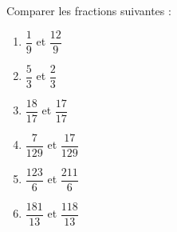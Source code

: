\begin{exercice*}
   Comparer les fractions suivantes : \medskip
   \begin{multicols}{2}
      \begin{enumerate}
         \item $\dfrac{1}{9}$ et $\dfrac{12}{9}$ \bigskip
         \item $\dfrac{5}{3}$ et $\dfrac{2}{3}$ \bigskip
         \item $\dfrac{18}{17}$ et $\dfrac{17}{17}$ \bigskip
         \item $\dfrac{7}{129}$ et $\dfrac{17}{129}$ \bigskip
         \item $\dfrac{123}{6}$ et $\dfrac{211}{6}$ \bigskip
         \item $\dfrac{181}{13}$ et $\dfrac{118}{13}$
      \end{enumerate}
   \end{multicols}
\end{exercice*}